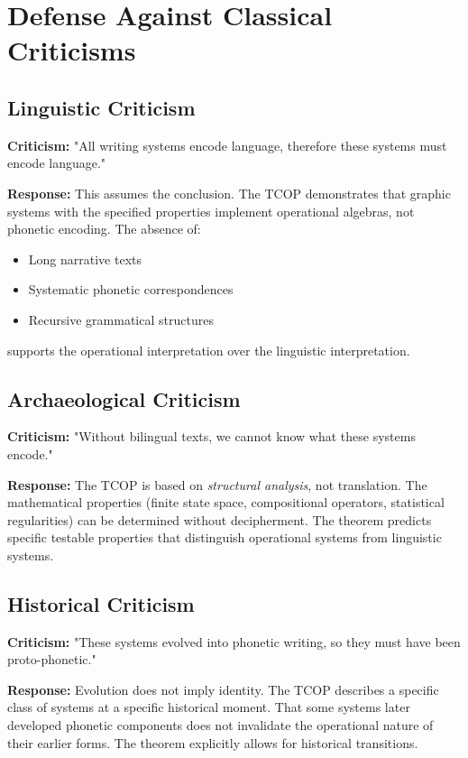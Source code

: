 \documentclass[12pt,a4paper]{article}
\begin{document}
\section{Defense Against Classical Criticisms}

\subsection{Linguistic Criticism}

\textbf{Criticism:} "All writing systems encode language, therefore these systems must encode language."

\textbf{Response:} This assumes the conclusion. The TCOP demonstrates that graphic systems with the specified properties implement operational algebras, not phonetic encoding. The absence of:
\begin{itemize}
    \item Long narrative texts
    \item Systematic phonetic correspondences
    \item Recursive grammatical structures
\end{itemize}
supports the operational interpretation over the linguistic interpretation.

\subsection{Archaeological Criticism}

\textbf{Criticism:} "Without bilingual texts, we cannot know what these systems encode."

\textbf{Response:} The TCOP is based on \textit{structural analysis}, not translation. The mathematical properties (finite state space, compositional operators, statistical regularities) can be determined without decipherment. The theorem predicts specific testable properties that distinguish operational systems from linguistic systems.

\subsection{Historical Criticism}

\textbf{Criticism:} "These systems evolved into phonetic writing, so they must have been proto-phonetic."

\textbf{Response:} Evolution does not imply identity. The TCOP describes a specific class of systems at a specific historical moment. That some systems later developed phonetic components does not invalidate the operational nature of their earlier forms. The theorem explicitly allows for historical transitions.
\end{document}
